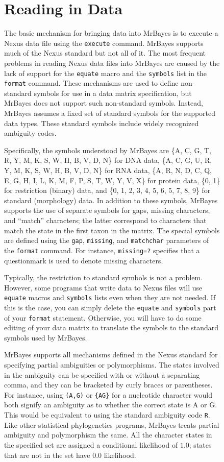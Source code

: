 \documentclass[12pt]{book}
\newcommand{\ttt}[1]{\texttt{#1}}
\begin{document}
\begin{figure}[h]
\section{Reading in Data}

The basic mechanism for bringing data into MrBayes is to execute a Nexus data file using the
\ttt{execute} command. MrBayes supports much of the Nexus standard \citep{Maddison97} but not all
of it. The most frequent problems in reading Nexus data files into MrBayes are caused by the lack
of support for the \ttt{equate} macro and the \ttt{symbols} list in the \ttt{format} command. These
mechanisms are used to define non-standard symbols for use in a data matrix specification, but
MrBayes does not support such non-standard symbols. Instead, MrBayes assumes a fixed set of
standard symbols for the supported data types. These standard symbols include widely recognized
ambiguity codes.

Specifically, the symbols understood by MrBayes are  \{A, C, G, T, R, Y, M, K, S, W, H, B, V, D,
N\} for DNA data, \{A, C, G, U, R, Y, M, K, S, W, H, B, V, D, N\} for RNA data, \{A, R, N, D, C, Q,
E, G, H, I, L, K, M, F, P, S, T, W, Y, V, X\} for protein data, \{0, 1\} for restriction (binary)
data, and \{0, 1, 2, 3, 4, 5, 6, 5, 7, 8, 9\} for standard (morphology) data. In addition to these
symbols, MrBayes supports the use of separate symbols for gaps, missing characters, and ``match''
characters; the latter correspond to characters that match the state in the first taxon in the
matrix. The special symbols are defined using the \ttt{gap}, \ttt{missing}, and \ttt{matchchar}
parameters of the \ttt{format} command. For instance, \ttt{missing=?} specifies that a questionmark
is used to denote missing characters.

Typically, the restriction to standard symbols is not a problem. However, some programs that write
data to Nexus files will use \ttt{equate} macros and \ttt{symbols} lists even when they are not
needed. If this is the case, you can simply delete the \ttt{equate} and \ttt{symbols} part of your
\ttt{format} statement. Otherwise, you will have to do some editing of your data matrix to
translate the symbols to the standard symbols used by MrBayes.

MrBayes supports all mechanisms defined in the Nexus standard for specifying partial ambiguities or
polymorphisms. The states involved in the ambiguity can be specified with or without a separating
comma, and they can be bracketed by curly braces or parentheses. For instance, using \ttt{(A,G)} or
\ttt{\{AG\}} for a nucleotide character would both signify an ambiguity as to whether the correct
state is A or G. This would be equivalent to using the standard ambiguity code \ttt{R}. Like other
statistical phylogenetics programs, MrBayes treats partial ambiguity and polymorphism the same. All
the character states in the specified set are assigned a conditional likelihood of $1.0$; states
that are not in the set have $0.0$ likelihood.


\end{figure}
\end{document}
